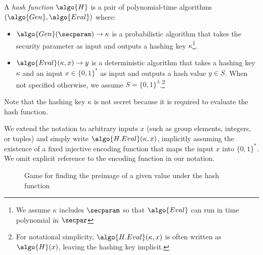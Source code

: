 \begin{definition}
  A \emph{hash function} $\algo{H}$ is a pair of polynomial-time algorithms $(\algo{Gen}, \algo{Eval})$ where:
  \begin{itemize}
  \item $\algo{Gen}(\secparam) \rightarrow \kappa$ is a probabilistic algorithm that takes the security parameter as input and outputs a hashing key $\kappa$\footnote{We assume $\kappa$ includes $\secparam$ so that $\algo{Eval}$ can run in time polynomial in $\secpar$}.
  \item $\algo{Eval}(\kappa, x) \rightarrow y$ is a deterministic algorithm that takes a hashing key $\kappa$ and an input $x \in \{0,1\}^*$ as input and outputs a hash value $y \in S$. When not specified otherwise, we assume $S = \{0,1\}^{\lambda}$.\footnote{For notational simplicity, $\algo{H.Eval}(\kappa, x)$ is often written as $\algo{H}(x)$, leaving the hashing key implicit.}
  \end{itemize}
\end{definition}

Note that the hashing key $\kappa$ is not secret because it is required to evaluate the hash function.

\begin{remark}
  We extend the notation to arbitrary inputs $x$ (such as group elements, integers, or tuples) and simply write $\algo{H.Eval}(\kappa, x)$, implicitly assuming the existence of a fixed injective encoding function that maps the input $x$ into $\{0,1\}^*$.
  We omit explicit reference to the encoding function in our notation.
\end{remark}

\begin{figure}[tbhp]
  \begin{center}
    \begin{tcolorbox}[width=5cm]
      \begin{pchstack}[center]
      \end{pchstack}
    \end{tcolorbox}
  \end{center}
  \caption{Game for finding the preimage of a given value under the hash function \label{fig:break-hash}}
\end{figure}


